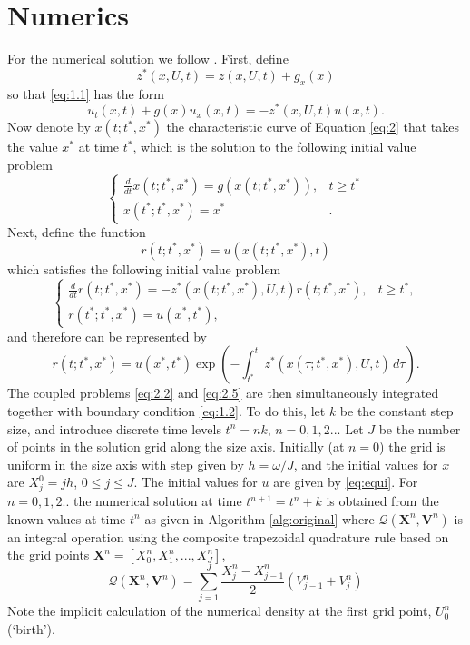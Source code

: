 \documentclass{article}
\begin{document}
\section{Numerics}
For the numerical solution we follow \cite{Angulo2004}. First, define
\begin{equation}
  z^*(x,U,t)=z(x,U,t)+g_x(x)
\end{equation}
so that \ref{eq:1.1} has the form
\begin{equation}\label{eq:2}
  u_t(x,t) + g(x)u_x(x,t) = -z^*(x,U,t)u(x,t).
\end{equation}
Now denote by $x(t;t^*,x^*)$ the characteristic curve of Equation \ref{eq:2} that takes the value $x^*$ at time $t^*$, which is the solution to the following initial value problem
\begin{equation}\label{eq:2.2}
  \begin{cases}
    \frac{d}{dt} x(t;t^*,x^*)=g(x(t;t^*,x^*)), & t\geq t^*\\
    x(t^*;t^*,x^*)=x^* &. 
  \end{cases}
\end{equation}
Next, define the function
\begin{equation}
  r(t;t^*,x^*)=u(x(t;t^*,x^*),t)
\end{equation}
which satisfies the following initial value problem
\begin{equation}
  \begin{cases}
    \frac{d}{dt} r(t;t^*,x^*)=-z^*(x(t;t^*,x^*),U,t)r(t;t^*,x^*), & t\geq t^*,\\
    r(t^*;t^*,x^*) = u(x^*,t^*), &
  \end{cases}
\end{equation}
and therefore can be represented by 
\begin{equation}\label{eq:2.5}
  r(t;t^*,x^*)=u(x^*,t^*)\exp\left(-\int_{t^*}^{t}z^*(x(\tau;t^*,x^*),U,t)\,d\tau\right).
\end{equation}
The coupled problems \ref{eq:2.2} and \ref{eq:2.5} are then simultaneously integrated together with boundary condition \ref{eq:1.2}. To do this, let $k$ be the constant step size, and introduce discrete time levels $t^n = nk$, $n=0,1,2..$. Let $J$ be the number of points in the solution grid along the size axis. Initially (at $n=0$) the grid is uniform in the size axis with step given by $h=\omega / J$, and the initial values for $x$ are $X_j^0 = jh$, $0\leq j\leq J$. The initial values for $u$ are given by \ref{eq:equi}. For $n=0,1,2..$ the numerical solution at time $t^{n+1}=t^n+k$ is obtained from the known values at time $t^n$ as given in Algorithm \ref{alg:original} where $\mathcal{Q}(\mathbf{X}^n,\mathbf{V}^n)$ is an integral operation using the composite trapezoidal quadrature rule based on the grid points $\mathbf{X}^n = [X_0^n,X_1^n,...,X_J^n]$,
\begin{equation}
  \mathcal{Q}\left(\mathbf{X}^n,\mathbf{V}^n\right) = \sum_{j=1}^J \frac{ X_j^n - X_{j-1}^n}{2}\left(V_{j-1}^n + V_j^n\right)
\end{equation}
Note the implicit calculation of the numerical density at the first grid point, $U_0^n$ (`birth'). 
\end{document}
